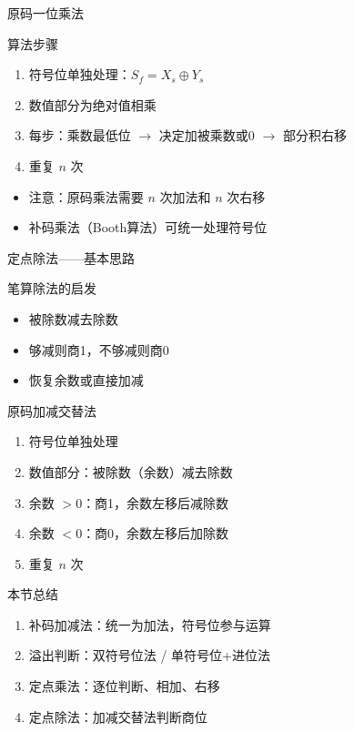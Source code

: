 \documentclass[10pt, aspectratio=169]{beamer}
\begin{document}
\begin{frame}{原码一位乘法}
    \begin{block}{算法步骤}
        \begin{enumerate}
            \item 符号位单独处理：$S_f = X_s \oplus Y_s$
            \item 数值部分为绝对值相乘
            \item 每步：乘数最低位 $\to$ 决定加被乘数或0 $\to$ 部分积右移
            \item 重复 $n$ 次
        \end{enumerate}
    \end{block}
    \vspace{0.3em}
    \begin{itemize}
        \item 注意：原码乘法需要 $n$ 次加法和 $n$ 次右移
        \item 补码乘法（Booth算法）可统一处理符号位
    \end{itemize}
\end{frame}

\begin{frame}{定点除法——基本思路}
    \begin{block}{笔算除法的启发}
        \begin{itemize}
            \item 被除数减去除数
            \item 够减则商1，不够减则商0
            \item 恢复余数或直接加减
        \end{itemize}
    \end{block}
    \vspace{0.3em}
    \begin{block}{原码加减交替法}
        \begin{enumerate}
            \item 符号位单独处理
            \item 数值部分：被除数（余数）减去除数
            \item 余数 $> 0$：商1，余数左移后减除数
            \item 余数 $< 0$：商0，余数左移后加除数
            \item 重复 $n$ 次
        \end{enumerate}
    \end{block}
\end{frame}

\begin{frame}{本节总结}
    \begin{enumerate}
        \item 补码加减法：统一为加法，符号位参与运算
        \item 溢出判断：双符号位法 / 单符号位+进位法
        \item 定点乘法：逐位判断、相加、右移
        \item 定点除法：加减交替法判断商位
    \end{enumerate}
\end{frame}
\end{document}
